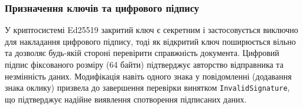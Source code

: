 \subsubsection{Призначення ключів та цифрового підпису}

У криптосистемі Ed25519 закритий ключ є секретним і застосовується виключно для накладання цифрового підпису, тоді як відкритий ключ поширюється вільно та дозволяє будь-якій стороні перевірити справжність документа. Цифровий підпис фіксованого розміру (64 байти) підтверджує авторство відправника та незмінність даних. Модифікація навіть одного знака у повідомленні (додавання знака оклику) призвела до завершення перевірки винятком \texttt{InvalidSignature}, що підтверджує надійне виявлення спотворення підписаних даних.
